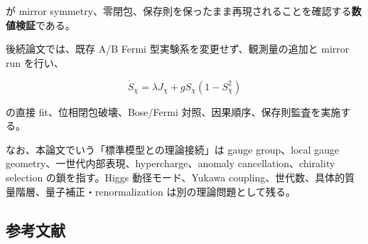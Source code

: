 \documentclass[
  a4paper,
]{ltjsarticle}
\begin{document}
が mirror
symmetry、零閉包、保存則を保ったまま再現されることを確認する\textbf{数値検証}である。

後続論文では、既存 A/B Fermi 型実験系を変更せず、観測量の追加と mirror
run を行い、

\[
\dot S_\chi
=
\lambda J_\chi
+
gS_\chi(1-S_\chi^2)
\]

の直接 fit、位相閉包破壊、Bose/Fermi
対照、因果順序、保存則監査を実施する。

なお、本論文でいう「標準模型との理論接続」は gauge group、local gauge
geometry、一世代内部表現、hypercharge、anomaly cancellation、chirality
selection の鎖を指す。Higgs 動径モード、Yukawa
coupling、世代数、具体的質量階層、量子補正・renormalization
は別の理論問題として残る。

\subsection{参考文献}\label{ux53c2ux8003ux6587ux732e}
\end{document}
